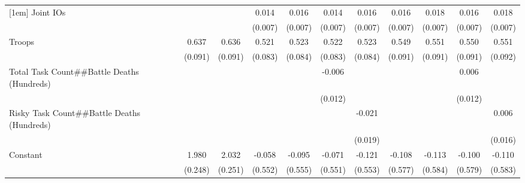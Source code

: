 \begin{table}[htbp]
\begin{tabular}{l*{10}{c}}
[1em]
Joint IOs           &                    &                    &       0.014\sym{+} &       0.016\sym{*} &       0.014\sym{+} &       0.016\sym{*} &       0.016\sym{*} &       0.018\sym{**}&       0.016\sym{*} &       0.018\sym{**}\\
                    &                    &                    &     (0.007)        &     (0.007)        &     (0.007)        &     (0.007)        &     (0.007)        &     (0.007)        &     (0.007)        &     (0.007)        \\
[1em]
Troops              &       0.637\sym{**}&       0.636\sym{**}&       0.521\sym{**}&       0.523\sym{**}&       0.522\sym{**}&       0.523\sym{**}&       0.549\sym{**}&       0.551\sym{**}&       0.550\sym{**}&       0.551\sym{**}\\
                    &     (0.091)        &     (0.091)        &     (0.083)        &     (0.084)        &     (0.083)        &     (0.084)        &     (0.091)        &     (0.091)        &     (0.091)        &     (0.092)        \\
[1em]
Total Task Count##Battle Deaths (Hundreds)&                    &                    &                    &                    &      -0.006        &                    &                    &                    &       0.006        &                    \\
                    &                    &                    &                    &                    &     (0.012)        &                    &                    &                    &     (0.012)        &                    \\
[1em]
Risky Task Count##Battle Deaths (Hundreds)&                    &                    &                    &                    &                    &      -0.021        &                    &                    &                    &       0.006        \\
                    &                    &                    &                    &                    &                    &     (0.019)        &                    &                    &                    &     (0.016)        \\
[1em]
Constant            &       1.980\sym{**}&       2.032\sym{**}&      -0.058        &      -0.095        &      -0.071        &      -0.121        &      -0.108        &      -0.113        &      -0.100        &      -0.110        \\
                    &     (0.248)        &     (0.251)        &     (0.552)        &     (0.555)        &     (0.551)        &     (0.553)        &     (0.577)        &     (0.584)        &     (0.579)        &     (0.583)        \\

\end{tabular}
\end{table}
